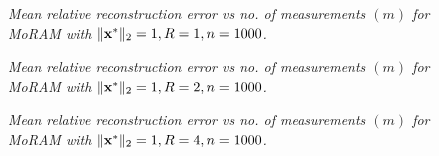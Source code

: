 %
%


\begin{figure}[!t]
	\centering
	
	\caption{\sl Mean relative reconstruction error vs no. of measurements $(m)$ for MoRAM with $\|\mathbf{x^*}\|_2=1,R=1,n=1000$.} \label{fig:plot-r-1}
\end{figure}

\begin{figure}[!t]
	\centering
	
	\caption{\sl Mean relative reconstruction error vs no. of measurements $(m)$ for MoRAM with $\|\mathbf{x^*}\|_2=1,R=2,n=1000$.} \label{fig:plot-r-2}
\end{figure}

\begin{figure}[!t]
	\centering
	
	\caption{\sl Mean relative reconstruction error vs no. of measurements $(m)$ for MoRAM with $\|\mathbf{x^*}\|_2=1,R=4,n=1000$.} \label{fig:plot-r-4}
\end{figure}

